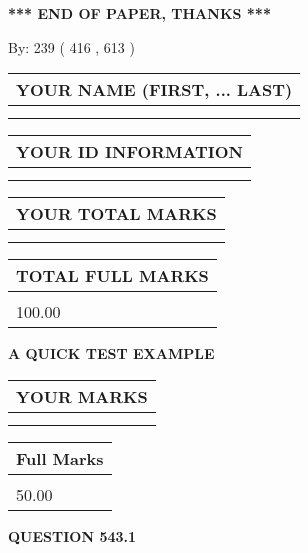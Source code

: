 \documentclass[12pt]{article}
\begin{document}
\vspace{1.0in} 
{\textbf{\large{ *** END OF PAPER, THANKS *** }}} 
   
   
\hspace{1.0in} By: 
 239 ( 416 ,  613 )
   
   
   
   
\newpage 
\setcounter{page}{ 
   543001 } 
   
   
   
   
\noindent\begin{tabular}{|l|}
\hline
YOUR NAME (FIRST, ... LAST)  \\
\hline
 \\ 
 \\ 
\hline
\end{tabular}
\hspace{0.05in} \begin{tabular}{|l|}
\hline
 YOUR   ID   INFORMATION  \\
\hline
 \\ 
 \\ 
\hline
\end{tabular}
   
   
\vspace{0.2in}\noindent\begin{tabular}{|l|}
\hline
YOUR TOTAL MARKS  \\
\hline
 \\ 
 \\ 
\hline
\end{tabular}
\hspace{0.05in} \begin{tabular}{|l|}
\hline
TOTAL FULL MARKS  \\
\hline
 \\ 
100.00 \\
\hline
\end{tabular}
   
   
 \vspace{0.2in}
{\LARGE {\textbf{ A QUICK TEST EXAMPLE}}}
   
   
  
\vspace{0.2in}
  
\noindent\begin{tabular}{|l|}
\hline
 YOUR MARKS  \\
\hline
 \\ 
 \\ 
\hline
\end{tabular}
\hspace{0.05in} \begin{tabular}{|l|}
\hline
 Full Marks  \\
\hline
 \\ 
50.00 \\
\hline
\end{tabular}
{\textbf{\Large{QUESTION
543.1 
}}}
  
\end{document}
